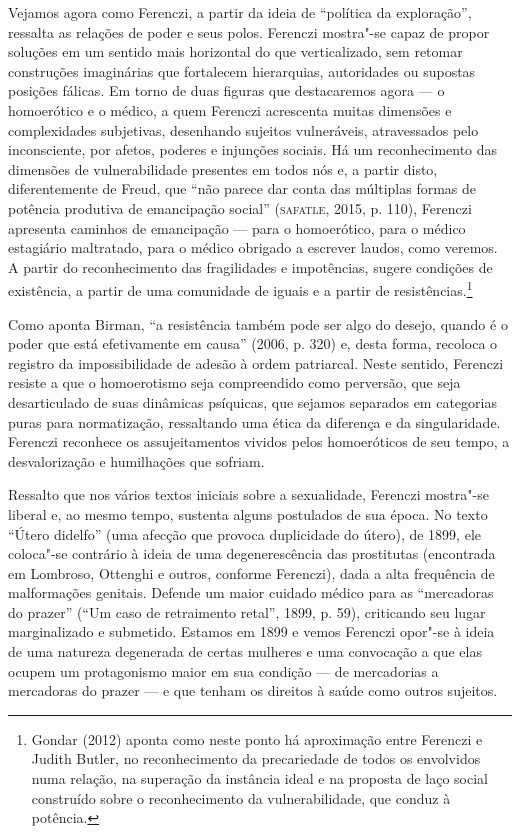 Vejamos agora como Ferenczi, a partir da ideia de ``política da
exploração'', ressalta as relações de poder e seus polos. Ferenczi
mostra"-se capaz de propor soluções em um sentido mais horizontal do que
verticalizado, sem retomar construções imaginárias que fortalecem
hierarquias, autoridades ou supostas posições fálicas. Em torno de duas
figuras que destacaremos agora --- o homoerótico e o médico, a quem
Ferenczi acrescenta muitas dimensões e complexidades subjetivas,
desenhando sujeitos vulneráveis, atravessados pelo inconsciente, por
afetos, poderes e injunções sociais. Há um reconhecimento das dimensões
de vulnerabilidade presentes em todos nós e, a partir disto,
diferentemente de Freud, que ``não parece dar conta das múltiplas formas
de potência produtiva de emancipação social'' (\textsc{safatle}, 2015, p. 110),
Ferenczi apresenta caminhos de emancipação --- para o homoerótico, para o
médico estagiário maltratado, para o médico obrigado a escrever laudos,
como veremos. A partir do reconhecimento das fragilidades e impotências,
sugere condições de existência, a partir de uma comunidade de iguais e a
partir de resistências.\footnote{Gondar (2012) aponta como neste ponto há
  aproximação entre Ferenczi e Judith Butler, no reconhecimento da
  precariedade de todos os envolvidos numa relação, na superação da
  instância ideal e na proposta de laço social construído sobre o
  reconhecimento da vulnerabilidade, que conduz à potência.}

Como aponta Birman, ``a resistência também pode ser algo
do desejo, quando é o poder que está efetivamente em causa'' (2006, p. 320) e, desta
forma, recoloca o registro da impossibilidade de adesão à ordem
patriarcal. Neste sentido, Ferenczi resiste a que o homoerotismo seja
compreendido como perversão, que seja desarticulado de suas dinâmicas
psíquicas, que sejamos separados em categorias puras para normatização,
ressaltando uma ética da diferença e da singularidade. Ferenczi
reconhece os assujeitamentos vividos pelos homoeróticos de seu tempo, a
desvalorização e humilhações que sofriam.

Ressalto que nos vários textos iniciais sobre a sexualidade, Ferenczi
mostra"-se liberal e, ao mesmo tempo, sustenta alguns postulados de sua
época. No texto ``Útero didelfo'' (uma afecção que provoca duplicidade do
útero), de 1899, ele coloca"-se contrário à ideia de uma degenerescência
das prostitutas (encontrada em Lombroso, Ottenghi e outros, conforme
Ferenczi), dada a alta frequência de malformações genitais. Defende um
maior cuidado médico para as ``mercadoras do prazer'' (``Um caso de
retraimento retal'', 1899, p. 59), criticando seu lugar marginalizado e
submetido. Estamos em 1899 e vemos Ferenczi opor"-se à ideia de uma
natureza degenerada de certas mulheres e uma convocação a que elas
ocupem um protagonismo maior em sua condição --- de mercadorias a
mercadoras do prazer --- e que tenham os direitos à saúde como outros
sujeitos.

